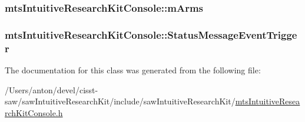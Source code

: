 \subsubsection[{m\+Arms}]{ mts\+Intuitive\+Research\+Kit\+Console\+::m\+Arms\hspace{0.3cm}{\ttfamily [protected]}}\label{classmts_intuitive_research_kit_console_abe94e9e6282e5d7f50aa033aa04bc015}
\hypertarget{classmts_intuitive_research_kit_console_ab15f69349bf2c5bc8fecd2fcb4de2107}{}
\subsubsection[{Status\+Message\+Event\+Trigger}]{ mts\+Intuitive\+Research\+Kit\+Console\+::\+Status\+Message\+Event\+Trigger\hspace{0.3cm}{\ttfamily [protected]}}\label{classmts_intuitive_research_kit_console_ab15f69349bf2c5bc8fecd2fcb4de2107}


The documentation for this class was generated from the following file\+:\begin{DoxyCompactItemize}
\item 
/\+Users/anton/devel/cisst-\/saw/saw\+Intuitive\+Research\+Kit/include/saw\+Intuitive\+Research\+Kit/\hyperlink{mts_intuitive_research_kit_console_8h}{mts\+Intuitive\+Research\+Kit\+Console.\+h}\end{DoxyCompactItemize}
